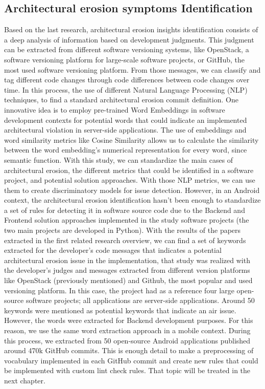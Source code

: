 \subsection{Architectural erosion symptoms Identification}
Based on the last research, architectural erosion insights identification consists of a deep analysis of information based on development judgments. This judgment can be extracted from different software versioning systems, like OpenStack, a software versioning platform for large-scale software projects, or GitHub, the most used software versioning platform. From those messages, we can classify and tag different code changes through code differences between code changes over time. In this process, the use of different Natural Language Processing (NLP) techniques, to find a standard architectural erosion commit definition. One innovative idea is to employ pre-trained Word Embeddings in software development contexts for potential words that could indicate an implemented architectural violation in server-side applications. The use of embeddings and word similarity metrics like Cosine Similarity allows us to calculate the similarity between the word embedding's numerical representation for every word, since semantic function. With this study, we can standardize the main cases of architectural erosion, the different metrics that could be identified in a software project, and potential solution approaches.
With those NLP metrics, we can use them to create discriminatory models for issue detection. However, in an Android context, the architectural erosion identification hasn't been enough to standardize a set of rules for detecting it in software source code due to the Backend and Frontend solution approaches implemented in the study software projects (the two main projects are developed in Python).
With the results of the papers extracted in the first related research overview, we can find a set of keywords extracted for the developer's code messages that indicates a potential architectural erosion issue in the implementation, that study was realized with the developer's judges and messages extracted from different version platforms like OpenStack (previously mentioned) and Github, the most popular and used versioning platform. In this case, the project had as a reference four large open-source software projects; all applications are server-side applications. Around 50 keywords were mentioned as potential keywords that indicate an air issue.
However, the words were extracted for Backend development purposes. For this reason, we use the same word extraction approach in a mobile context. During this process, we extracted from 50 open-source Android applications published around 470k GitHub commits. This is enough detail to make a preprocessing of vocabulary implemented in each GitHub commit and create new rules that could be implemented with custom lint check rules. That topic will be treated in the next chapter.

